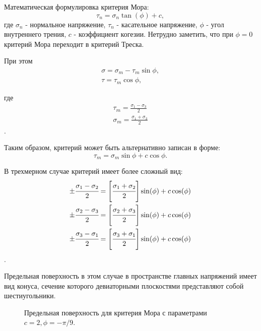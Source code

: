 Математическая формулировка критерия Мора:
\begin{equation}
\label{mohr_criteria}
\tau_n = \sigma_n\tan(\phi) + c,
\end{equation}
где $\sigma_n$ - нормальное напряжение, $\tau_n$ - касательное напряжение, $\phi$ - угол внутреннего трения, $c$ - коэффициент когезии. Нетрудно заметить, что при $\phi = 0$ критерий Мора переходит в критерий Треска.

При этом
\begin{eqnarray}
\sigma = \sigma_m - \tau_m \sin\phi, \\
\tau = \tau_m \cos\phi,
\end{eqnarray}

где
\begin{eqnarray}
\tau_m = \frac{\sigma_1-\sigma_3}{2} \\
\sigma_m = \frac{\sigma_1+\sigma_3}{2} 
\end{eqnarray}.

Таким образом, критерий может быть альтернативно записан в форме:
\begin{equation}
\tau_m = \sigma_m \sin\phi + c \cos\phi.
\end{equation}

В трехмерном случае критерий имеет более сложный вид:
\begin{eqnarray}
  \pm\cfrac{\sigma_1 - \sigma_2}{2} & = \left[\cfrac{\sigma_1 + \sigma_2}{2}\right]\sin(\phi) + c\cos(\phi) \\
  \pm\cfrac{\sigma_2 - \sigma_3}{2} & = \left[\cfrac{\sigma_2 + \sigma_3}{2}\right]\sin(\phi) + c\cos(\phi) \\
  \pm\cfrac{\sigma_3 - \sigma_1}{2} & = \left[\cfrac{\sigma_3 + \sigma_1}{2}\right]\sin(\phi) + c\cos(\phi)
\end{eqnarray}.

Предельная поверхность в этом случае в пространстве главных напряжений имеет вид конуса, сечение которого девиаторными плоскостями представляют собой шестиугольники.

\begin{figure}[h]
\caption{Предельная поверхность для критерия Мора с параметрами $c = 2, \phi = -\pi/9$.}
\end{figure}


